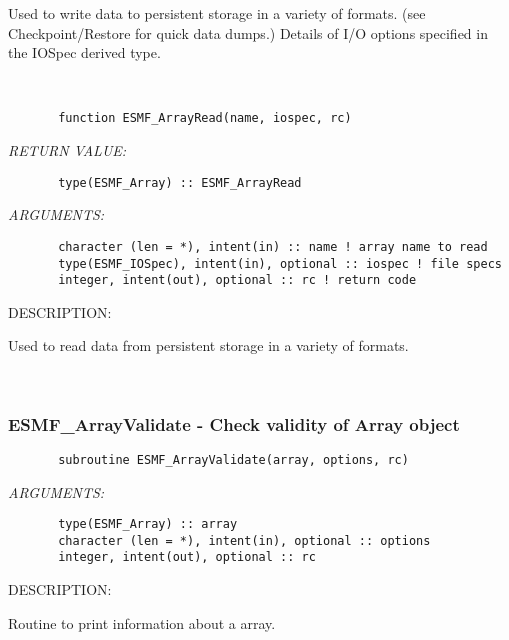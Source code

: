    Used to write data to persistent storage in a variety of formats.
   (see Checkpoint/Restore for quick data dumps.) Details of I/O
   options specified in the IOSpec derived type.
  
   
 
\mbox{}\hrulefill\ 
 

\begin{verbatim}       function ESMF_ArrayRead(name, iospec, rc)\end{verbatim}{\em RETURN VALUE:}
\begin{verbatim}       type(ESMF_Array) :: ESMF_ArrayRead\end{verbatim}{\em ARGUMENTS:}
\begin{verbatim}       character (len = *), intent(in) :: name ! array name to read
       type(ESMF_IOSpec), intent(in), optional :: iospec ! file specs
       integer, intent(out), optional :: rc ! return code\end{verbatim}
{\sf DESCRIPTION:\\ }


   Used to read data from persistent storage in a variety of formats.
  
   
 
\mbox{}\hrulefill\ 
 
\subsubsection [ESMF\_ArrayValidate] {ESMF\_ArrayValidate - Check validity of Array object}


  
\begin{verbatim}       subroutine ESMF_ArrayValidate(array, options, rc)\end{verbatim}{\em ARGUMENTS:}
\begin{verbatim}       type(ESMF_Array) :: array
       character (len = *), intent(in), optional :: options
       integer, intent(out), optional :: rc\end{verbatim}
{\sf DESCRIPTION:\\ }


   Routine to print information about a array.
   
 
\mbox{}\hrulefill\ 
 
